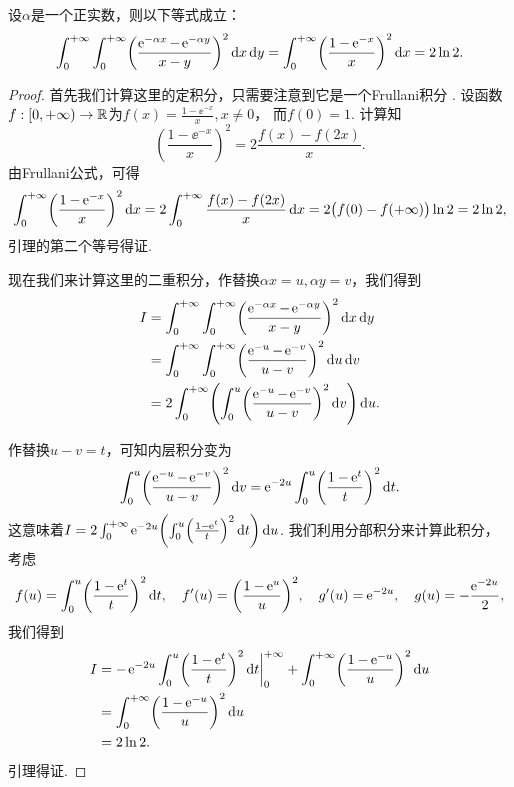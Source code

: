 \begin{mybox}
  \begin{lemma}[伪装的Frullani积分.]

    设$\alpha$是一个正实数，则以下等式成立：
    \[
      \int_0^{+\infty}\int_0^{+\infty}\left( \frac{\ee^{-\alpha x} - \ee^{-\alpha y}}{x-y} \right)^2 \dif x\dif y =
      \int_0^{+\infty} \left( \frac{1-\ee^{-x}}x \right)^2 \dif x = 2\ln2.
    \]
  \end{lemma}
\end{mybox}
\begin{proof}
  首先我们计算这里的定积分，只需要注意到它是一个Frullani积分 \cite{33}. 设函数$f:[0,+\infty)\to\mathbb R$为$f(x)=\frac{1-\ee^{-x}}x,x\ne0$， 而$f(0)=1$. 计算知
  \[
    \left( \frac{1-\ee^{-x}}x \right)^2 = 2 \frac{f(x) - f(2x)} x.
  \]
  由Frullani公式，可得
  \[
    \int_0^{+\infty} \left( \frac{1-\ee^{-x}}x \right)^2 \dif x = 2\int_0^{+\infty} \frac{f(x) - f(2x)}x \dif x = 2\big( f(0) - f(+\infty) \big)\ln2 = 2\ln2,
  \]
  引理的第二个等号得证.

  现在我们来计算这里的二重积分，作替换$\alpha x=u,\alpha y=v$，我们得到
  \begin{align*}
    I & = \int_0^{+\infty}\int_0^{+\infty}\left( \frac{\ee^{-\alpha x} - \ee^{-\alpha y}}{x-y} \right)^2 \dif x\dif y \\
    & = \int_0^{+\infty}\int_0^{+\infty}\left( \frac{\ee^{-u} - \ee^{-v}}{u-v} \right)^2 \dif u\dif v \\
    & = 2\int_0^{+\infty}\left( \int_0^u\left( \frac{\ee^{-u} - \ee^{-v}}{u - v}\right) ^2 \dif v \right) \dif u .
  \end{align*}

  作替换$u-v=t$，可知内层积分变为
  \[
    \int_0^u\left( \frac{\ee^{-u} - \ee^{-v}}{u - v}\right) ^2 \dif v = \ee^{-2u} \int_0^u
    \left( \frac{1-\ee^t}t \right)^2 \dif t.
  \]
  这意味着$I=2\int_0^{+\infty}\ee^{-2u}\left( \int_0^u
    \left( \frac{1-\ee^t}t \right)^2 \dif t \right)\dif u$. 我们利用分部积分来计算此积分，考虑
    \[
      f(u) = \int_0^u
    \left( \frac{1-\ee^t}t \right)^2 \dif t,\quad f'(u) = \left( \frac{1-\ee^u}u\right)^2,\quad g'(u)=\ee^{-2u},\quad g(u) = - \frac{\ee^{-2u}}2,
    \]
    我们得到
    \begin{align*}
      I & = -\ee^{-2u} \int_0^u
    \left( \frac{1-\ee^t}t \right)^2 \dif t\bigg|_0^{+\infty} + \int_0^{+\infty}
    \left( \frac{1-\ee^{-u}}u \right)^2 \dif u \\
    & = \int_0^{+\infty}
    \left( \frac{1-\ee^{-u}}u \right)^2 \dif u \\
    & = 2\ln2.
    \end{align*}
    引理得证.
\end{proof}

